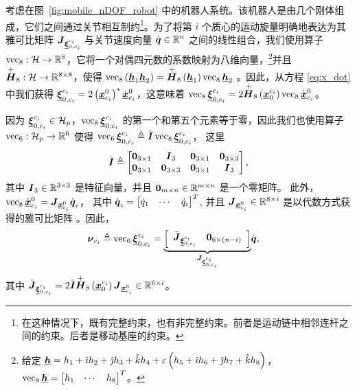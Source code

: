 考虑在图~\ref{fig:mobile_nDOF_robot} 中的机器人系统。该机器人是由几个刚体组成，它们之间通过关节相互制约\footnote{在这种情况下，既有完整约束，也有非完整约束。前者是运动链中相邻连杆之间的约束。后者是移动基座的约束。}。为了将第 $i$ 个质心的运动旋量明确地表达为其雅可比矩阵 $\boldsymbol{J}_{\underline{\boldsymbol{\xi}}_{0,c_{i}}^{c_{i}}}$ 与关节速度向量 $\dot{\boldsymbol{q}}\in\mathbb{R}^{n}$ 之间的线性组合，我们使用算子 $\operatorname{vec}_{8}:\mathcal{H}\to\mathbb{R}^{8}$，它将一个对偶四元数的系数映射为八维向量，\footnote{给定 $\underline{\boldsymbol{h}}=h_{1}+\hat{\imath} h_{2}+\hat{\jmath} h_{3}+\hat{k} h_{4}+\varepsilon\left(h_{5}+\hat{\imath} h_{6}+\hat{\jmath} h_{7}+\hat{k} h_{8}\right)$，
$\operatorname{vec}_{8}\underline{\boldsymbol{h}}=\begin{bmatrix}h_{1} & \cdots & h_{8}\end{bmatrix}^{T}$。}并且 $\overset{+}{\operatorname{\boldsymbol{H}}}_{8}:\mathcal{H}\to\mathbb{R}^{8\times8}$，使得 $\operatorname{vec}_{8}\left(\underline{\boldsymbol{h}}_{1}\underline{\boldsymbol{h}}_{2}\right)=\overset{+}{\operatorname{\boldsymbol{H}}}_{8}\left(\underline{\boldsymbol{h}}_{1}\right)\operatorname{vec}_{8}\underline{\boldsymbol{h}}_{2}$ \cite{Adorno2011}。因此，从方程 \eqref{eq:x_dot} 中我们获得 $\underline{\boldsymbol{\xi}}_{0,c_{i}}^{c_{i}}=2\left(\underline{\boldsymbol{x}}_{c_{i}}^{0}\right)^{*}\dot{\underline{\boldsymbol{x}}}_{c_{i}}^{0}$，这意味着 $\operatorname{vec}_{8}\underline{\boldsymbol{\xi}}_{0,c_{i}}^{c_{i}}=2\overset{+}{\operatorname{\boldsymbol{H}}}_{8}\left(\underline{\boldsymbol{x}}_{0}^{c_{i}}\right)\operatorname{vec}_{8}\dot{\underline{\boldsymbol{x}}}_{c_{i}}^{0}$。

因为 $\underline{\boldsymbol{\xi}}_{0,c_{i}}^{c_{i}}\in\mathcal{H}_{p}$，$\operatorname{vec}_{8}\underline{\boldsymbol{\xi}}_{0,c_{i}}^{c_{i}}$ 的第一个和第五个元素等于零，因此我们也使用算子 $\operatorname{vec}_{6}:\mathcal{H}_{p}\to\mathbb{R}^{6}$
使得 $\operatorname{vec}_{6}\underline{\boldsymbol{\xi}}_{0,c_{i}}^{c_{i}}\triangleq\bar{\boldsymbol{I}}\operatorname{vec}_{8}\underline{\boldsymbol{\xi}}_{0,c_{i}}^{c_{i}}$，
这里
\[
\bar{\boldsymbol{I}}\triangleq\begin{bmatrix}\boldsymbol{0}_{3\times1} & \boldsymbol{I}_{3} & \boldsymbol{0}_{3\times1} & \boldsymbol{0}_{3\times3}\\
\boldsymbol{0}_{3\times1} & \boldsymbol{0}_{3\times3} & \boldsymbol{0}_{3\times1} & \boldsymbol{I}_{3}
\end{bmatrix},
\]
其中 $\boldsymbol{I}_{3}\in\mathbb{R}^{3\times3}$ 是特征向量，并且 $\boldsymbol{0}_{m\times n}\in\mathbb{R}^{m\times n}$ 是一个零矩阵。 此外，$\operatorname{vec}_{8}\dot{\underline{\boldsymbol{x}}}_{c_{i}}^{0}=\boldsymbol{J}_{\underline{\boldsymbol{x}}_{c_{i}}^{0}}\dot{\boldsymbol{q}}_{i}$，
其中 $\dot{\boldsymbol{q}}_{i}=\begin{bmatrix}\dot{q}_{1} & \cdots & \dot{q}_{i}\end{bmatrix}^{T}$,
并且 $\boldsymbol{J}_{\underline{\boldsymbol{x}}_{c_{i}}^{0}}\in\mathbb{R}^{8\times i}$ 是以代数方式获得的雅可比矩阵 \cite{Adorno2011}。因此，
\begin{align}
\boldsymbol{\nu}_{c_{i}}\triangleq\operatorname{vec}_{6}\underline{\boldsymbol{\xi}}_{0,c_{i}}^{c_{i}} & =\underset{\boldsymbol{J}_{\underline{\boldsymbol{\xi}}_{0,c_{i}}^{c_{i}}}}{\underbrace{\left[\begin{array}{cc}
\bar{\boldsymbol{J}}_{\underline{\boldsymbol{\xi}}_{0,c_{i}}^{c_{i}}} & \boldsymbol{0}_{6\times(n-i)}\end{array}\right]}}\dot{\boldsymbol{q}},\label{eq:ConstrainedVel}
\end{align}
其中 $\bar{\boldsymbol{J}}_{\underline{\boldsymbol{\xi}}_{0,c_{i}}^{c_{i}}}=2\bar{\boldsymbol{I}}\overset{+}{\operatorname{\boldsymbol{H}}}_{8}\left(\underline{\boldsymbol{x}}_{0}^{c_{i}}\right)\boldsymbol{J}_{\underline{\boldsymbol{x}}_{c_{i}}^{0}}\in\mathbb{R}^{6\times i}$。

